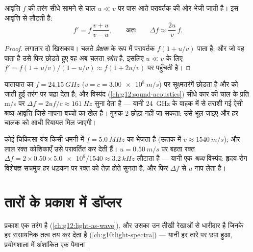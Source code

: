 \begin{proposition}[परावर्तन खिसकाव को दुगुना कर देता है]\label{prop:g12:doppler-effect:double}
आवृत्ति $f$ की तरंग सीधे सामने से चाल $u \ll v$ पर पास आते
परावर्तक की ओर भेजी जाती है।  इस आवृत्ति से लौटती है:
\[ f' = f\,\frac{v + u}{v - u}, \qquad \text{अतः} \qquad \Delta f \approx \frac{2u}{v}\,f . \]
\end{proposition}

\begin{proof}
लगातार दो खिसकाव। चलते \emph{प्रेक्षक} के रूप में परावर्तक $f(1 + u/v)$ पाता है;
और जो वह पाता है उसे फिर छोड़ते हुए वह अब चलता \emph{स्रोत} है, इसलिए
 $u \ll v$ के लिए $f' = f(1 + u/v)/(1 - u/v) \approx f(1 + 2u/v)$ पर पहुँचती है।
\end{proof}

\begin{example}[रडार बंदूक़]\label{ex:g12:doppler-effect:radar}
यातायात का  $f = \qty{24.15}{GHz}$ ($v = c = \qty{3.00e8}{m/s}$) पर सूक्ष्मतरंगें छोड़ता है और
 को जाती हुई तरंग पर चढ़ा देता है; और विस्पंद
(\cref{ch:g12:sound-acoustics}) सीधे कार की चाल के प्रति \unit{m/s} पर $\Delta f = 2uf/c \approx \qty{161}{Hz}$ सुना देता है
--- यानी \qty{24}{GHz} के वाहक में से तराशी गई ऐसी श्रव्य आवृत्ति जिसे नापना
बच्चों का खेल है। गुणक $2$ छोड़ा नहीं जा सकता: उसे भूल जाइए और हर चालक को
आधी रियायत मिल जाएगी।
\end{example}

\begin{example}[डॉप्लर पराश्रव्य]\label{ex:g12:doppler-effect:ultrasound}
कोई चिकित्सा-यंत्र किसी धमनी में $f = \qty{5.0}{MHz}$ का  भेजता है (ऊतक
में $v \approx \qty{1540}{m/s}$); और लाल रक्त कोशिकाएँ उसे परावर्तित कर देती हैं। $u = \qty{0.50}{m/s}$ पर बहता
रक्त $\Delta f = 2 \times 0.50 \times \num{5.0e6}/1540 \approx
\qty{3.2}{kHz}$ लौटाता है --- यानी एक \emph{श्रव्य} विस्पंद: हृदय-रोग विशेषज्ञ
सचमुच हर धड़कन पर रक्त को तेज़ होते सुनता है, और फिर $\Delta f$ से $u$ नाप
लेता है।
\end{example}

\section{तारों के प्रकाश में डॉप्लर}

प्रकाश एक तरंग है (\cref{ch:g12:light-as-wave}), और उसका  उन तीखी रेखाओं
से धारीदार है जिनके  हर रासायनिक तत्व तय कर देता है
(\cref{ch:g10:light-spectra}) --- यानी हर तारे पर छपा हुआ, प्रयोगशाला में अंशांकित एक पैमाना।

